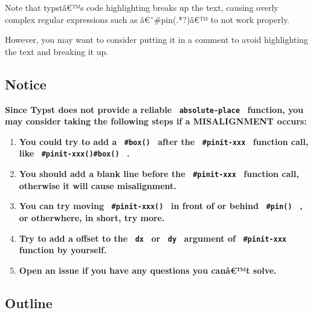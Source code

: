 Note that typstâ€™s code highlighting breaks up the text, causing overly
complex regular expressions such as â€˜\#pin(.*?)â€™ to not work
properly.

However, you may want to consider putting it in a comment to avoid
highlighting the text and breaking it up.

\subsection{Notice}\label{notice}

\textbf{Since Typst does not provide a reliable
\texttt{\ absolute-place\ } function, you may consider taking the
following steps if a MISALIGNMENT occurs:}

\begin{enumerate}
\tightlist
\item
  \textbf{You could try to add a \texttt{\ \#box()\ } after the
  \texttt{\ \#pinit-xxx\ } function call, like
  \texttt{\ \#pinit-xxx()\#box()\ } .}
\item
  \textbf{You should add a blank line before the
  \texttt{\ \#pinit-xxx\ } function call, otherwise it will cause
  misalignment.}
\item
  \textbf{You can try moving \texttt{\ \#pinit-xxx()\ } in front of or
  behind \texttt{\ \#pin()\ } , or otherwhere, in short, try more.}
\item
  \textbf{Try to add a offset to the \texttt{\ dx\ } or \texttt{\ dy\ }
  argument of \texttt{\ \#pinit-xxx\ } function by yourself.}
\item
  \textbf{Open an issue if you have any questions you canâ€™t solve.}
\end{enumerate}

\subsection{Outline}\label{outline}

